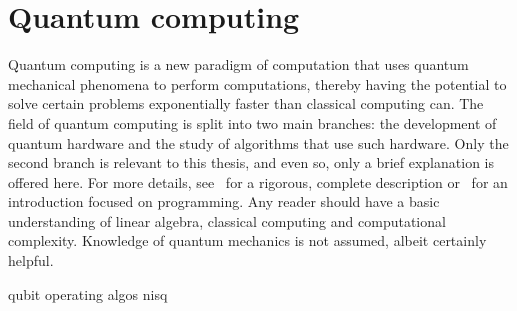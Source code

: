 \chapter{Quantum computing}
\label{chap:qc}
Quantum computing is a new paradigm of computation that uses quantum mechanical phenomena to perform computations, thereby having the potential to solve certain problems exponentially faster than classical computing can.
The field of quantum computing is split into two main branches: the development of quantum hardware and the study of algorithms that use such hardware.
Only the second branch is relevant to this thesis, and even so, only a brief explanation is offered here.
For more details, see~\autocite{nielsen2012} for a rigorous, complete description or~\autocite{qiskit_textbook} for an introduction focused on programming.
Any reader should have a basic understanding of linear algebra, classical computing and computational complexity.
Knowledge of quantum mechanics is not assumed, albeit certainly helpful.

{qubit}
{operating}
{algos}
{nisq}





